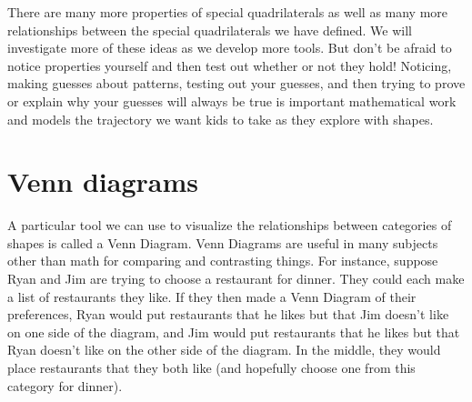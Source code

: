 \documentclass{ximera}
\begin{document}
There are many more properties of special quadrilaterals as well as many more relationships between the special quadrilaterals we have defined. We will investigate more of these ideas as we develop more tools. But don't be afraid to notice properties yourself and then test out whether or not they hold! Noticing, making guesses about patterns, testing out your guesses, and then trying to prove or explain why your guesses will always be true is important mathematical work and models the trajectory we want kids to take as they explore with shapes.

\section{Venn diagrams}

A particular tool we can use to visualize the relationships between categories of shapes is called a Venn Diagram. Venn Diagrams are useful in many subjects other than math for comparing and contrasting things. For instance, suppose Ryan and Jim are trying to choose a restaurant for dinner. They could each make a list of restaurants they like. If they then made a Venn Diagram of their preferences, Ryan would put restaurants that he likes but that Jim doesn't like on one side of the diagram, and Jim would put restaurants that he likes but that Ryan doesn't like on the other side of the diagram. In the middle, they would place restaurants that they both like (and hopefully choose one from this category for dinner).

\begin{image}
\end{image}
\end{document}
